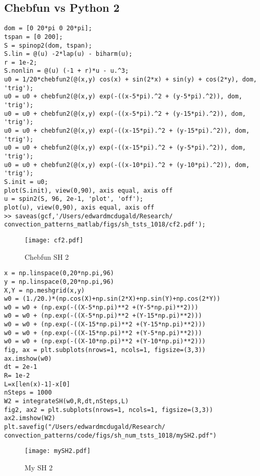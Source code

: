 \documentclass[12pt]{article}
\begin{document}
\subsection{Chebfun vs Python 2}
\begin{verbatim}
dom = [0 20*pi 0 20*pi];
tspan = [0 200];
S = spinop2(dom, tspan);
S.lin = @(u) -2*lap(u) - biharm(u);
r = 1e-2; 
S.nonlin = @(u) (-1 + r)*u - u.^3;
u0 = 1/20*chebfun2(@(x,y) cos(x) + sin(2*x) + sin(y) + cos(2*y), dom, 'trig');
u0 = u0 + chebfun2(@(x,y) exp(-((x-5*pi).^2 + (y-5*pi).^2)), dom, 'trig');
u0 = u0 + chebfun2(@(x,y) exp(-((x-5*pi).^2 + (y-15*pi).^2)), dom, 'trig');
u0 = u0 + chebfun2(@(x,y) exp(-((x-15*pi).^2 + (y-15*pi).^2)), dom, 'trig');
u0 = u0 + chebfun2(@(x,y) exp(-((x-15*pi).^2 + (y-5*pi).^2)), dom, 'trig');
u0 = u0 + chebfun2(@(x,y) exp(-((x-10*pi).^2 + (y-10*pi).^2)), dom, 'trig');
S.init = u0;
plot(S.init), view(0,90), axis equal, axis off
u = spin2(S, 96, 2e-1, 'plot', 'off');
plot(u), view(0,90), axis equal, axis off
>> saveas(gcf,'/Users/edwardmcdugald/Research/
convection_patterns_matlab/figs/sh_tsts_1018/cf2.pdf');  
\end{verbatim}
 \begin{figure}[ht]
        \centering
        \texttt{[image: cf2.pdf]}
        \caption{Chebfun SH 2}
    \end{figure}
\FloatBarrier
\begin{verbatim}
x = np.linspace(0,20*np.pi,96)
y = np.linspace(0,20*np.pi,96)
X,Y = np.meshgrid(x,y)
w0 = (1./20.)*(np.cos(X)+np.sin(2*X)+np.sin(Y)+np.cos(2*Y))
w0 = w0 + (np.exp(-((X-5*np.pi)**2 +(Y-5*np.pi)**2)))
w0 = w0 + (np.exp(-((X-5*np.pi)**2 +(Y-15*np.pi)**2)))
w0 = w0 + (np.exp(-((X-15*np.pi)**2 +(Y-15*np.pi)**2)))
w0 = w0 + (np.exp(-((X-15*np.pi)**2 +(Y-5*np.pi)**2)))
w0 = w0 + (np.exp(-((X-10*np.pi)**2 +(Y-10*np.pi)**2)))
fig, ax = plt.subplots(nrows=1, ncols=1, figsize=(3,3))
ax.imshow(w0)
dt = 2e-1
R= 1e-2
L=x[len(x)-1]-x[0]
nSteps = 1000
W2 = integrateSH(w0,R,dt,nSteps,L)
fig2, ax2 = plt.subplots(nrows=1, ncols=1, figsize=(3,3))
ax2.imshow(W2)
plt.savefig("/Users/edwardmcdugald/Research/
convection_patterns/code/figs/sh_num_tsts_1018/mySH2.pdf")
\end{verbatim}
 \begin{figure}[ht]
        \centering
        \texttt{[image: mySH2.pdf]}
        \caption{My SH 2}
    \end{figure}
\FloatBarrier
\end{document}
